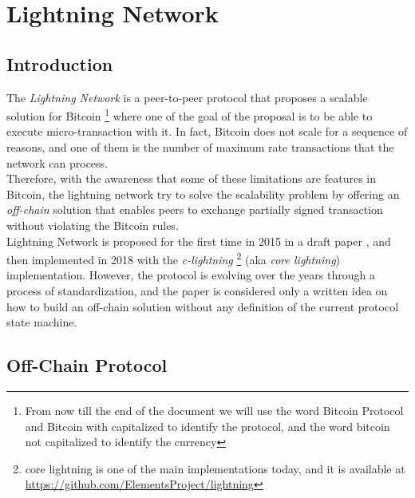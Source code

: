 \setcounter{page}{1}

\chapter{Lightning Network}

\newcommand{\noteOnBitcoinNaming}[0]{
    \footnote{
        From now till the end of the document we will use the word Bitcoin Protocol and
        Bitcoin with capitalized to identify the protocol, and the word bitcoin not capitalized to identify the currency
    }
}

\newcommand{\noteOnCLNImpl}[0]{
    \footnote{
    core lightning is one of the main implementations today, and it is available at
    \href{https://github.com/ElementsProject/lightning}{https://github.com/ElementsProject/lightning}
    }
}



\section{Introduction}

The \emph{Lightning Network} is a peer-to-peer protocol that proposes a scalable solution for Bitcoin\noteOnBitcoinNaming where one
of the goal of the proposal is to be able to execute micro-transaction with it.
In fact, Bitcoin does not scale for a sequence of reasons, and one of them is the number of
maximum rate transactions that the network can process.\\
Therefore, with the awareness that some of these limitations are features in Bitcoin, the lightning network try to solve
the scalability problem by offering an \emph{off-chain} solution that enables peers to exchange partially
signed transaction without violating the Bitcoin rules.\\
Lightning Network is proposed for the first time in 2015 in a draft paper \cite{lightning-network-paper},
and then implemented in 2018 with the \emph{c-lightning}\noteOnCLNImpl (aka \emph{core lightning}) implementation.
However, the protocol is evolving over the years through a process of standardization\cite{lightning-bolts}, and the paper is considered
only a written idea on how to build an off-chain solution without any definition of the current protocol state machine.

\section{Off-Chain Protocol}

